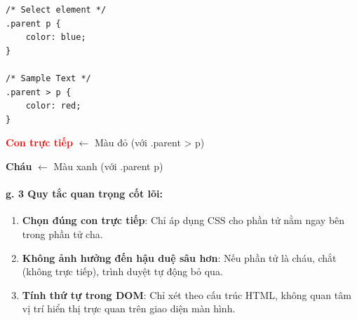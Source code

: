 \documentclass[11pt,oneside]{book}
\newcommand{\thd}[1]{\textcolor{white}{\textbf{\strut #1}}}
\begin{document}
\begin{prettyTableBox}
\sffamily\small
{}
\end{prettyTableBox}

\begin{codeWindow}
\begin{lstlisting}[language=CSS3]
/* Select element */
.parent p { 
    color: blue; 
}

/* Sample Text */
.parent > p { 
    color: red; 
}
\end{lstlisting}
\end{codeWindow}

\begin{browserWindow}
\sffamily\small
\textcolor{red}{\textbf{Con trực tiếp}} {\small\textcolor{gray!60}{$\leftarrow$ Màu đỏ (với .parent > p)}} \par\vspace{2pt}
\textcolor{primaryBlue}{\textbf{Cháu}} {\small\textcolor{gray!60}{$\leftarrow$ Màu xanh (với .parent p)}}
\end{browserWindow}

\paragraph{g. 3 Quy tắc quan trọng cốt lõi:}

\begin{noteBox}
\begin{enumerate}[leftmargin=1.5em, itemsep=3pt, parsep=0pt]
    \item \textbf{Chọn đúng con trực tiếp}: Chỉ áp dụng CSS cho phần tử nằm ngay bên trong phần tử cha.
    \item \textbf{Không ảnh hưởng đến hậu duệ sâu hơn}: Nếu phần tử là cháu, chắt (không trực tiếp), trình duyệt tự động bỏ qua.
    \item \textbf{Tính thứ tự trong DOM}: Chỉ xét theo cấu trúc HTML, không quan tâm vị trí hiển thị trực quan trên giao diện màn hình.
\end{enumerate}
\end{noteBox}
\end{document}
